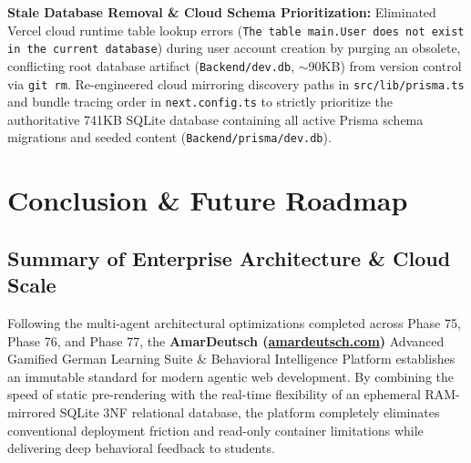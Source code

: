 \documentclass[12pt,a4paper]{article}
\begin{document}
\begin{description}[style=multiline, leftmargin=2.5cm, font=\bfseries\color{primaryBlue}]
    \item[Phase 77] \textbf{Stale Database Removal \& Cloud Schema Prioritization:} Eliminated Vercel cloud runtime table lookup errors (\texttt{The table main.User does not exist in the current database}) during user account creation by purging an obsolete, conflicting root database artifact (\texttt{Backend/dev.db}, $\sim$90KB) from version control via \texttt{git rm}. Re-engineered cloud mirroring discovery paths in \texttt{src/lib/prisma.ts} and bundle tracing order in \texttt{next.config.ts} to strictly prioritize the authoritative 741KB SQLite database containing all active Prisma schema migrations and seeded content (\texttt{Backend/prisma/dev.db}).
\end{description}

\section{Conclusion \& Future Roadmap}

\subsection{Summary of Enterprise Architecture \& Cloud Scale}
Following the multi-agent architectural optimizations completed across Phase 75, Phase 76, and Phase 77, the \textbf{AmarDeutsch (\url{amardeutsch.com})} Advanced Gamified German Learning Suite \& Behavioral Intelligence Platform establishes an immutable standard for modern agentic web development. By combining the speed of static pre-rendering with the real-time flexibility of an ephemeral RAM-mirrored SQLite 3NF relational database, the platform completely eliminates conventional deployment friction and read-only container limitations while delivering deep behavioral feedback to students.
\end{document}

